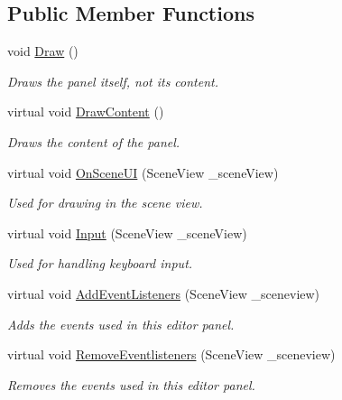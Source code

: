 \subsection*{Public Member Functions}
\begin{DoxyCompactItemize}
\item 
void \hyperlink{class_base_editor_group_a53cc4ec2f041f1d72b0d6468bb930658}{Draw} ()
\begin{DoxyCompactList}\small\item\em Draws the panel itself, not it\textquotesingle{}s content. \end{DoxyCompactList}\item 
virtual void \hyperlink{class_base_editor_group_a8a41e2753ba3c316a1c7fe35ef21897c}{Draw\+Content} ()
\begin{DoxyCompactList}\small\item\em Draws the content of the panel. \end{DoxyCompactList}\item 
virtual void \hyperlink{class_base_editor_group_a2c80ae4df91e93e3d9a1e8e5ea134d7b}{On\+Scene\+UI} (Scene\+View \+\_\+scene\+View)
\begin{DoxyCompactList}\small\item\em Used for drawing in the scene view. \end{DoxyCompactList}\item 
virtual void \hyperlink{class_base_editor_group_a3cd9cee8a3c93fa0c59ad2dac854f367}{Input} (Scene\+View \+\_\+scene\+View)
\begin{DoxyCompactList}\small\item\em Used for handling keyboard input. \end{DoxyCompactList}\item 
virtual void \hyperlink{class_base_editor_group_adaf80fa090e685d7dcd1804f3eac10ca}{Add\+Event\+Listeners} (Scene\+View \+\_\+sceneview)
\begin{DoxyCompactList}\small\item\em Adds the events used in this editor panel. \end{DoxyCompactList}\item 
virtual void \hyperlink{class_base_editor_group_ad584907c5813f11cf979fd9fc80c70c8}{Remove\+Eventlisteners} (Scene\+View \+\_\+sceneview)
\begin{DoxyCompactList}\small\item\em Removes the events used in this editor panel. \end{DoxyCompactList}\end{DoxyCompactItemize}
